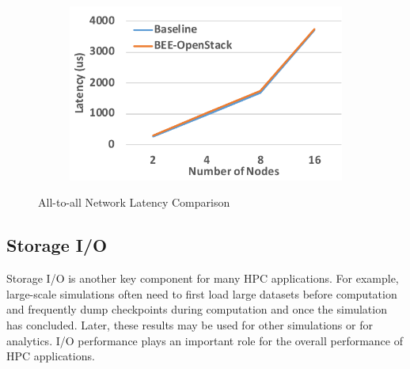 \begin{figure}[t]
\begin{subfigure}[t]{0.245\textwidth}
    \end{subfigure}
    \begin{subfigure}[t]{0.245\textwidth}
        \includegraphics[width=\textwidth]{figures/cl-bee-os.pdf}
    \end{subfigure}
    \caption{All-to-all Network Latency Comparison}
    \label{net-lat-all}
    \vspace*{-2em}
\end{figure}
\subsection{Storage I/O }
Storage I/O is another key component for many HPC applications. For example, large-scale simulations often need to first load large datasets before computation and frequently dump checkpoints during computation and once the simulation has concluded. Later, these results may be used for other simulations or for analytics. I/O performance plays an important role for the overall performance of HPC applications. 

